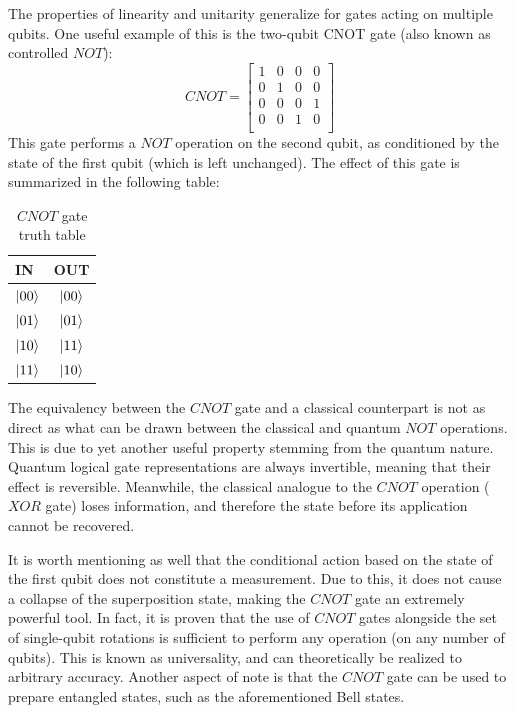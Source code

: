 The properties of linearity and unitarity generalize for gates acting on multiple qubits. One useful example of this is the two-qubit CNOT gate (also known as controlled $NOT$):
\begin{equation}
    CNOT=\begin{bmatrix}
        1&0&0&0\\
        0&1&0&0\\		 		
        0&0&0&1\\
        0&0&1&0\\
    \end{bmatrix}
\end{equation}
This gate performs a $NOT$ operation on the second qubit, as conditioned by the state of the first qubit (which is left unchanged). The effect of this gate is summarized in the following table:
\begin{table}[hbt!]
    \centering
    \begin{tabular}{l | c }
        IN & OUT\\
        \hline \hline
        $\ket{00}$ & $\ket{00}$ \\ 
        $\ket{01}$ & $\ket{01}$\\
        $\ket{10}$ & $\ket{11}$\\
        $\ket{11}$ & $\ket{10}$
    \end{tabular}
\caption{$CNOT$ gate truth table}
\end{table}

\FloatBarrier

The equivalency between the $CNOT$ gate and a classical counterpart is not as direct as what can be drawn between the classical and quantum $NOT$ operations. This is due to yet another useful property stemming from the quantum nature. Quantum logical gate representations are always invertible, meaning that their effect is reversible. Meanwhile, the classical analogue to the $CNOT$ operation ($XOR$ gate) loses information, and therefore the state before its application cannot be recovered.

It is worth mentioning as well that the conditional action based on the state of the first qubit does not constitute a measurement. Due to this, it does not cause a collapse of the superposition state, making the $CNOT$ gate an extremely powerful tool. In fact, it is proven that the use of $CNOT$ gates alongside the set of single-qubit rotations is sufficient to perform any operation (on any number of qubits). This is known as universality, and can theoretically be realized to arbitrary accuracy. Another aspect of note is that the $CNOT$ gate can be used to prepare entangled states, such as the aforementioned Bell states.

